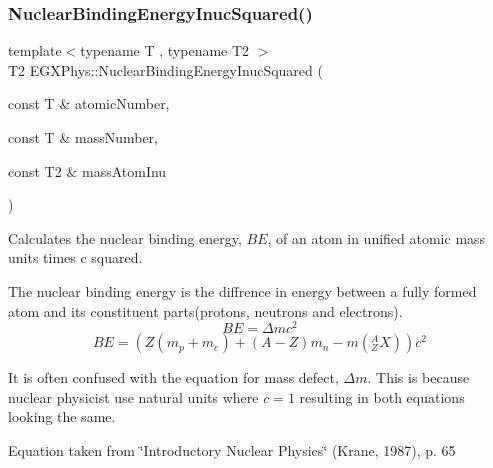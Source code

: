 \subsubsection{\texorpdfstring{Nuclear\+Binding\+Energy\+Inuc\+Squared()}{NuclearBindingEnergyInucSquared()}}
{\footnotesize\ttfamily template$<$typename T , typename T2 $>$ \\
T2 E\+G\+X\+Phys\+::\+Nuclear\+Binding\+Energy\+Inuc\+Squared (\begin{DoxyParamCaption}\item[{const T \&}]{atomic\+Number,  }\item[{const T \&}]{mass\+Number,  }\item[{const T2 \&}]{mass\+Atom\+Inu }\end{DoxyParamCaption})}



Calculates the nuclear binding energy, $BE$, of an atom in unified atomic mass units times c squared. 

The nuclear binding energy is the diffrence in energy between a fully formed atom and its constituent parts(protons, neutrons and electrons). \[BE = \Delta m c^2\] \[BE = \left (Z(m_p + m_e)+(A-Z)m_n - m({^A_ZX}) \right ) c^2\]

It is often confused with the equation for mass defect, $\Delta m$. This is because nuclear physicist use natural units where $c = 1$ resulting in both equations looking the same.

Equation taken from \char`\"{}\+Introductory Nuclear Physics\char`\"{} (Krane, 1987), p. 65


